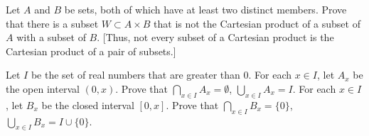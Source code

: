 \item Let $A$ and $B$ be sets, both of which have at least two distinct members. Prove that there is a subset $W \subset A \times B$ that is not the Cartesian product of a subset of $A$ with a subset of $B$. [Thus, not every subset of a Cartesian product is the Cartesian product of a pair of subsets.]

\begin{comment}


\ExerciseSolution Let $A$ and $B$ be sets, both of which have at least two distinct members. Let $a_1$ and $a_2$ be distinct elements of $A$ and $b_1$, $b_2$ distinct elements of $B$. Let $W = \{(a_1,b_2), (a_2, b_1)\}$. Since the elements of $W$ are ordered pairs of elements, first from $A$, then from $B$, it follows that $W \subset A \times B$. To show that $W$ is not a Cartesian product of a subset of $A$ with a subset of $B$, we proceed by contradiction and suppose that $W = A' \times B'$ for some subsets $A'$ of $A$ and $B'$ of $B$. Since $(a_1, b_2)$ and $(a_2, b_1)$ are in $W$, it follows that $a_1, a_2 \in A'$ and $b_1, b_2 \in B'$. But then $(a_2, b_2) \in A' \times B'$. The fact that $(a_2,b_2) \notin W$ contradicts the fact that $W = A' \times B'$. We conclude that the assumption that led us to this contradiction is false, and that $W$ is is not the Cartesian product of a subset of $A$ with a subset of $B$. 

\end{comment}



\item Let $I$ be the set of real numbers that are greater than $0$. For each $x \in I$, let $A_x$ be the open interval $(0,x)$. Prove that $\bigcap_{x \in I} A_x = \emptyset$, $\bigcup_{x \in I} A_x = I$. For each $x \in I$, let $B_x$ be the closed interval $[0,x]$. Prove that $\bigcap_{x \in I} B_x = \{0\}$, $\bigcup_{x \in I} B_x = I \cup \{0\}$.

